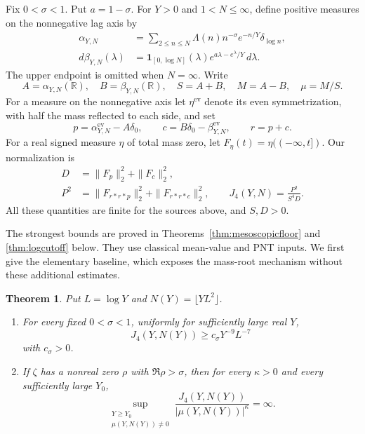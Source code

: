 \documentclass[11pt,a4paper]{article}
\newtheorem{theorem}{Theorem}[section]
\theoremstyle{definition}
\theoremstyle{remark}
\newcommand{\ev}{\mathrm{ev}}
\newcommand{\RR}{\mathbb R}
\newcommand{\dd}{\,d}
\begin{document}
Fix \(0<\sigma<1\). Put \(a=1-\sigma\). For \(Y>0\) and
\(1<N\le\infty\), define positive measures on the nonnegative lag axis by
\begin{align}
 \alpha_{Y,N}
 &=\sum_{2\le n\le N}\Lambda(n)n^{-\sigma}e^{-n/Y}\delta_{\log n},
 \label{eq:sources}\\
 d\beta_{Y,N}(\lambda)
 &=\mathbf1_{[0,\log N]}(\lambda)e^{a\lambda-e^\lambda/Y}\dd\lambda.
 \nonumber
\end{align}
The upper endpoint is omitted when \(N=\infty\). Write
\[
 A=\alpha_{Y,N}(\RR),\quad B=\beta_{Y,N}(\RR),\quad
 S=A+B,\quad M=A-B,\quad \mu=M/S.
\]
For a measure on the nonnegative axis let \(\eta^\ev\) denote its even
symmetrization, with half the mass reflected to each side, and set
\[
 p=\alpha_{Y,N}^\ev-A\delta_0,\qquad
 c=B\delta_0-\beta_{Y,N}^\ev,\qquad r=p+c.
\]
For a real signed measure \(\eta\) of total mass zero, let
\(F_\eta(t)=\eta((-\infty,t])\). Our normalization is
\begin{equation}
 \begin{split}
 D&=\|F_p\|_2^2+\|F_c\|_2^2,\\
 P^2&=\|F_{r*r*p}\|_2^2+\|F_{r*r*c}\|_2^2,\qquad
 J_4(Y,N)=\frac{P^2}{S^4D}.
 \end{split}
 \label{eq:response}
\end{equation}
All these quantities are finite for the sources above, and \(S,D>0\).

The strongest bounds are proved in
Theorems~\ref{thm:mesoscopicfloor} and \ref{thm:logcutoff} below.
They use classical mean-value and PNT inputs. We first give the
elementary baseline, which exposes the mass-root mechanism without
these additional estimates.

\begin{theorem}\label{thm:main}
Put \(L=\log Y\) and \(N(Y)=\lfloor YL^2\rfloor\).
\begin{enumerate}
 \item For every fixed \(0<\sigma<1\), uniformly for sufficiently large
 real \(Y\),
 \begin{equation}
 J_4(Y,N(Y))\ge c_\sigma Y^{-9}L^{-7}
 \label{eq:floor}
 \end{equation}
 with \(c_\sigma>0\).
 \item If \(\zeta\) has a nonreal zero \(\rho\) with \(\Re\rho>\sigma\),
 then for every \(\kappa>0\) and every sufficiently large \(Y_0\),
 \begin{equation}
 \sup_{\substack{Y\ge Y_0\\ \mu(Y,N(Y))\ne0}}
 \frac{J_4(Y,N(Y))}{|\mu(Y,N(Y))|^\kappa}=\infty.
 \label{eq:nogo}
 \end{equation}
\end{enumerate}
\end{theorem}
\end{document}

